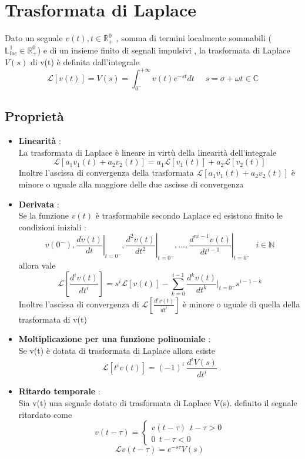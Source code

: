 \documentclass{article}
\theoremstyle{definition}
\newcommand{\R}{\mathbb{R}}
\begin{document}
	\section{Trasformata di Laplace}
	Dato un segnale $v(t) , t \in \R_+^0$ , somma di termini localmente sommabili ($\mathbb{L}_{loc}^1 \in \R_+^0$) e di un insieme finito di segnali impulsivi , la trasformata di Laplace $V(s)$ di v(t) è definita dall'integrale 
	$$\mathcal{L}[v(t)]=V(s)=\int_{0^-}^{+\infty}v(t) e^{-st}dt \ \ \ \ \ \ s=\sigma + \omega t \in \mathbb{C}$$
	\subsection{Proprietà}
	\begin{itemize}
		\item \textbf{Linearità} : \\ La trasformata di Laplace è lineare in virtù della linearità dell'integrale 
		$$\mathcal{L}[a_1v_1(t)+a_2v_2(t)]=a_1\mathcal{L}[v_1(t)]+a_2\mathcal{L}[v_2(t)]$$
		Inoltre l'ascissa di convergenza della trasformata $\mathcal{L}[a_1v_1(t)+a_2v_2(t)]$ è minore o uguale alla maggiore delle due ascisse di convergenza 
		\item \textbf{Derivata} : \\
		Se la funzione $v(t)$ è trasformabile secondo Laplace  ed esistono finito le condizioni iniziali :  $$v\left(0^{-}\right),\left.\frac{d v(t)}{d t}\right|_{t=0^{-}},\left.\frac{d^2 v(t)}{d t^2}\right|_{t=0^{-}}, \ldots,\left.\frac{d^{ni-1} v(t)}{d t^{i-1}}\right|_{t=0^{-}} \ \ \ i \in \mathbb{N}
		$$  allora vale 
		$$\mathcal{L}\left[\frac{d^iv(t)}{dt^i}\right]=s^i \mathcal{L}[v(t)] - \sum_{k=0}^{i-1}\frac{d^kv(t)}{dt^k} \big|_{t=0^-} s^{i-1-k}$$
		Inoltre l'ascissa di convergenza di $\mathcal{L}\left[\frac{d^iv(t)}{dt^i}\right]$ è minore o uguale di quella della trasformata di v(t)
	\item \textbf{Moltiplicazione per una funzione polinomiale} : \\ 
	Se v(t) è dotata di trasformata di Laplace allora esiste 
	$$\mathcal{L}[t^i v(t)]=(-1)^i\  \frac{d^iV(s)}{dt^i}$$
	\item \textbf{Ritardo temporale }: \\
	Sia v(t) una segnale dotato di trasformata di Laplace V(s). definito il segnale ritardato come 
	$$v(t-\tau)=\begin{cases}
	v(t-\tau)\ \  t-\tau>0\\
	0 \ \ t-\tau < 0
	\end{cases}$$
	$$\mathcal{L}{v(t-\tau)}=e^{-s\tau}V(s)$$ 

\end{itemize}
\end{document}
